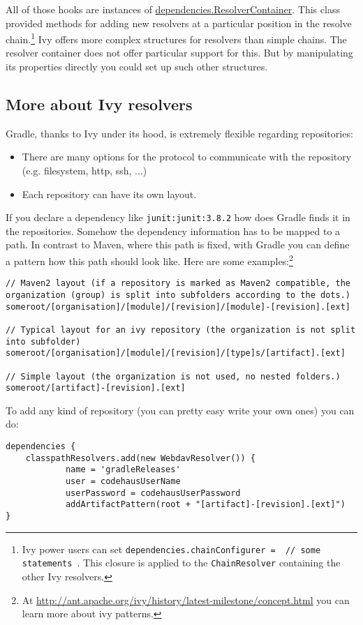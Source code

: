 All of those hooks are instances of \href{\API dependencies/ResolverContainer.html}{\PKG dependencies.ResolverContainer}. This class provided methods for adding new resolvers at a particular position in the resolve chain.\footnote{Ivy power users can set \texttt{dependencies.chainConfigurer = { // some statements }}. This closure is applied to the \texttt{ChainResolver} containing the other Ivy resolvers.} Ivy offers more complex structures for resolvers than simple chains. The resolver container does not offer particular support for this. But by manipulating its properties directly you could set up such other structures.

\subsection{More about Ivy resolvers} %
\label{sub:more_about_ivy_resolvers}
Gradle, thanks to Ivy under its hood, is extremely flexible regarding repositories:
\begin{itemize}
	\item There are many options for the protocol to communicate with the repository (e.g. filesystem, http, ssh, ...)
	\item Each repository can have its own layout.
\end{itemize}
If you declare a dependency like \texttt{junit:junit:3.8.2} how does Gradle finds it in the repositories. Somehow the dependency information has to be mapped to a path. In contrast to Maven, where this path is fixed, with Gradle you can define a pattern how this path should look like. Here are some examples:\footnote{At \url{http://ant.apache.org/ivy/history/latest-milestone/concept.html} you can learn more about ivy patterns.}
\begin{Verbatim}
// Maven2 layout (if a repository is marked as Maven2 compatible, the organization (group) is split into subfolders according to the dots.)
someroot/[organisation]/[module]/[revision]/[module]-[revision].[ext]

// Typical layout for an ivy repository (the organization is not split into subfolder)
someroot/[organisation]/[module]/[revision]/[type]s/[artifact].[ext]

// Simple layout (the organization is not used, no nested folders.)
someroot/[artifact]-[revision].[ext]
\end{Verbatim}
To add any kind of repository (you can pretty easy write your own ones) you can do:
\begin{Verbatim}
dependencies {
	classpathResolvers.add(new WebdavResolver()) {
	        name = 'gradleReleases'
	        user = codehausUserName
	        userPassword = codehausUserPassword
	        addArtifactPattern(root + "[artifact]-[revision].[ext]")
}
\end{Verbatim}
